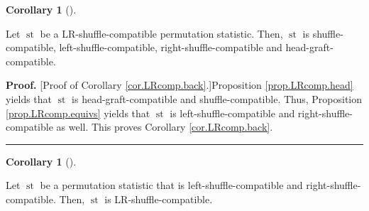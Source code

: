 \documentclass[numbers=enddot,12pt,final,onecolumn,notitlepage]{scrartcl}%
\theoremstyle{definition}
\newtheorem{coro}[theo]{Corollary}
\newenvironment{corollary}[1][]
{\begin{coro}[#1]\begin{leftbar}}
{\end{leftbar}\end{coro}}
\newenvironment{proof}[1][Proof]{\noindent\textbf{#1.} }{\ \rule{0.5em}{0.5em}}
\begin{document}
\begin{corollary}
\label{cor.LRcomp.back}Let $\operatorname*{st}$ be a LR-shuffle-compatible
permutation statistic. Then, $\operatorname*{st}$ is shuffle-compatible,
left-shuffle-compatible, right-shuffle-compatible and head-graft-compatible.
\end{corollary}

\begin{proof}
[Proof of Corollary \ref{cor.LRcomp.back}.]Proposition \ref{prop.LRcomp.head}
yields that $\operatorname*{st}$ is head-graft-compatible and
shuffle-compatible. Thus, Proposition \ref{prop.LRcomp.equivs} yields that
$\operatorname*{st}$ is left-shuffle-compatible and right-shuffle-compatible
as well. This proves Corollary \ref{cor.LRcomp.back}.
\end{proof}

\begin{corollary}
\label{cor.LRcomp.two}Let $\operatorname*{st}$ be a permutation statistic that
is left-shuffle-compatible and right-shuffle-compatible. Then,
$\operatorname*{st}$ is LR-shuffle-compatible.
\end{corollary}
\end{document}
